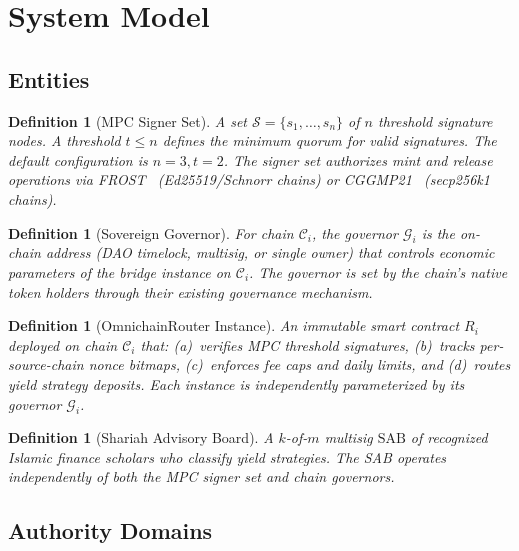 \documentclass[11pt,twocolumn]{article}
\newtheorem{definition}[theorem]{Definition}
\theoremstyle{definition}
\newcommand{\Gov}{\mathcal{G}}
\newcommand{\Signer}{\mathcal{S}}
\newcommand{\Chain}{\mathcal{C}}
\newcommand{\SAB}{\text{SAB}}
\begin{document}
\section{System Model}
\label{sec:system}

\subsection{Entities}

\begin{definition}[MPC Signer Set]
\label{def:signer}
A set $\Signer = \{s_1, \ldots, s_n\}$ of $n$ threshold signature nodes. A threshold $t \leq n$ defines the minimum quorum for valid signatures. The default configuration is $n = 3, t = 2$. The signer set authorizes mint and release operations via FROST~\cite{frost} (Ed25519/Schnorr chains) or CGGMP21~\cite{cggmp21} (secp256k1 chains).
\end{definition}

\begin{definition}[Sovereign Governor]
\label{def:governor}
For chain $\Chain_i$, the governor $\Gov_i$ is the on-chain address (DAO timelock, multisig, or single owner) that controls economic parameters of the bridge instance on $\Chain_i$. The governor is set by the chain's native token holders through their existing governance mechanism.
\end{definition}

\begin{definition}[OmnichainRouter Instance]
\label{def:router}
An immutable smart contract $R_i$ deployed on chain $\Chain_i$ that: (a)~verifies MPC threshold signatures, (b)~tracks per-source-chain nonce bitmaps, (c)~enforces fee caps and daily limits, and (d)~routes yield strategy deposits. Each instance is independently parameterized by its governor $\Gov_i$.
\end{definition}

\begin{definition}[Shariah Advisory Board]
\label{def:sab}
A $k$-of-$m$ multisig $\SAB$ of recognized Islamic finance scholars who classify yield strategies. The SAB operates independently of both the MPC signer set and chain governors.
\end{definition}

\subsection{Authority Domains}
\end{document}

